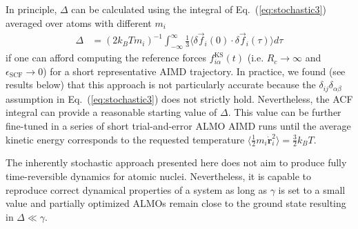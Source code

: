 \documentclass[aps,prl,reprint,amsmath,amssymb]{revtex4-1}
\begin{document}
In principle, $\Delta$ can be calculated using the integral of Eq.~(\ref{eq:stochastic3}) averaged over atoms with different $m_i$
%
\begin{align}
\label{eq:delta}
\Delta &= (2 k_B T m_i )^{-1} \int_{-\infty}^{\infty} \frac{1}{3} \langle \delta \vec{f}_i (0) \cdot \delta\vec{f}_i(\tau) \rangle d\tau
\end{align}
%
if one can afford computing the reference forces $f^{\text{KS}}_{i\alpha}(t)$ (i.e. $R_c \rightarrow \infty$ and $\epsilon_{\text{SCF}} \rightarrow 0$) for a short representative AIMD trajectory. 
In practice, we found (see results below) that this approach is not particularly accurate because the $\delta_{ij}\delta_{\alpha\beta}$ assumption in Eq.~(\ref{eq:stochastic3}) does not strictly hold. 
Nevertheless, the ACF integral can provide a reasonable starting value of $\Delta$. This value can be further fine-tuned in a series of short trial-and-error ALMO AIMD runs until the average kinetic energy corresponds to the requested temperature $\langle \frac{1}{2} m_i \dot{\bm{r}}^{2}_{i} \rangle = \frac{3}{2} k_{B} T$.

The inherently stochastic approach presented here does not aim to produce fully time-reversible dynamics for atomic nuclei. 
Nevertheless, it is capable to reproduce correct dynamical properties of a system as long as $\gamma$ is set to a small value and  partially optimized ALMOs remain close to the ground state resulting in $\Delta \ll \gamma$. 

\end{document}
